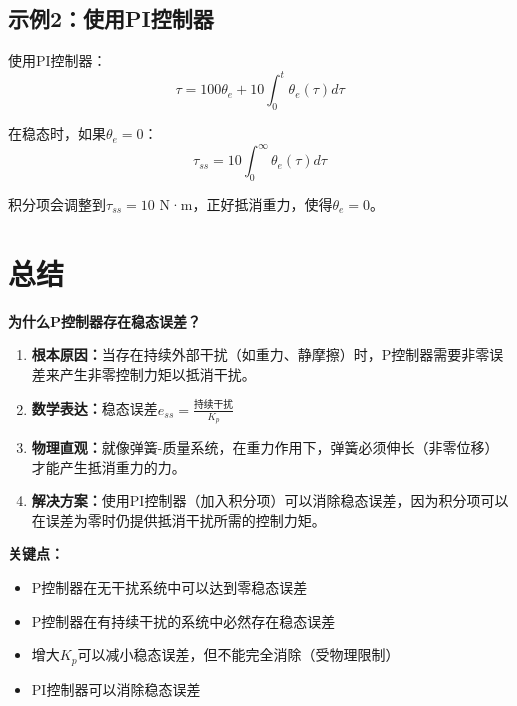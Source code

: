 \documentclass[12pt,a4paper]{article}
\begin{document}
\subsection{示例2：使用PI控制器}

使用PI控制器：
\begin{equation}
\tau = 100 \theta_e + 10 \int_0^t \theta_e(\tau) d\tau
\end{equation}

在稳态时，如果$\theta_e = 0$：
\begin{equation}
\tau_{ss} = 10 \int_0^{\infty} \theta_e(\tau) d\tau
\end{equation}

积分项会调整到$\tau_{ss} = 10$ N·m，正好抵消重力，使得$\theta_e = 0$。

\section{总结}

\textbf{为什么P控制器存在稳态误差？}

\begin{enumerate}
\item \textbf{根本原因：}当存在持续外部干扰（如重力、静摩擦）时，P控制器需要非零误差来产生非零控制力矩以抵消干扰。

\item \textbf{数学表达：}稳态误差$e_{ss} = \frac{\text{持续干扰}}{K_p}$

\item \textbf{物理直观：}就像弹簧-质量系统，在重力作用下，弹簧必须伸长（非零位移）才能产生抵消重力的力。

\item \textbf{解决方案：}使用PI控制器（加入积分项）可以消除稳态误差，因为积分项可以在误差为零时仍提供抵消干扰所需的控制力矩。
\end{enumerate}

\textbf{关键点：}
\begin{itemize}
\item P控制器在无干扰系统中可以达到零稳态误差
\item P控制器在有持续干扰的系统中必然存在稳态误差
\item 增大$K_p$可以减小稳态误差，但不能完全消除（受物理限制）
\item PI控制器可以消除稳态误差
\end{itemize}
\end{document}

